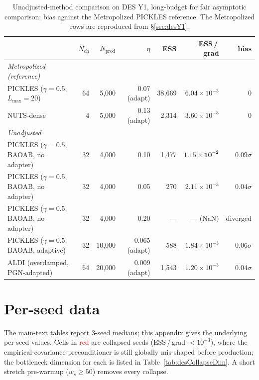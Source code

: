 \documentclass{article}
\begin{document}
\begin{table}[h]
\centering
\caption{Unadjusted-method comparison on DES Y1, long-budget for fair
asymptotic comparison; bias against the Metropolized PICKLES reference.
The Metropolized rows are reproduced from \S\ref{sec:desY1}.}
\label{tab:desUnadjLongN}
\small
\begin{tabular}{l rrrr rr}
\toprule
& $N_{\text{ch}}$ & $N_{\text{prod}}$ & $\eta$ & ESS &
ESS\,/\,grad & bias \\
\midrule
\textit{Metropolized (reference)} & & & & & & \\
\quad PICKLES ($\gamma=0.5$, $L_{\max}=20$) & 64 & 5{,}000 & 0.07 (adapt) & 38{,}669 & $6.04\!\times\!10^{-3}$ & 0 \\
\quad NUTS-dense                            & 4  & 5{,}000 & 0.13 (adapt) & 2{,}314  & $3.60\!\times\!10^{-3}$ & 0 \\
\midrule
\textit{Unadjusted} & & & & & & \\
\quad PICKLES ($\gamma=0.5$, BAOAB, no adapter) & 32 & 4{,}000 & 0.10  & 1{,}477 & $\mathbf{1.15\!\times\!10^{-2}}$ & $0.09\sigma$ \\
\quad PICKLES ($\gamma=0.5$, BAOAB, no adapter) & 32 & 4{,}000 & 0.05  &     270 & $2.11\!\times\!10^{-3}$ & $0.04\sigma$ \\
\quad PICKLES ($\gamma=0.5$, BAOAB, no adapter) & 32 & 4{,}000 & 0.20  & --- & --- (NaN) & diverged \\
\quad PICKLES ($\gamma=0.5$, BAOAB, adaptive)   & 32 & 10{,}000 & 0.065 (adapt) &  588 & $1.84\!\times\!10^{-3}$ & $0.06\sigma$ \\
\quad ALDI (overdamped, PGN-adapted)            & 64 & 20{,}000 & 0.009 (adapt) & 1{,}543 & $1.20\!\times\!10^{-3}$ & $0.04\sigma$ \\
\bottomrule
\end{tabular}
\end{table}

\section{Per-seed data}\label{app:desPerSeed}

The main-text tables report $3$-seed medians; this appendix gives the
underlying per-seed values. Cells in \textcolor{red}{red} are collapsed
seeds (ESS\,/\,grad $<\!10^{-3}$), where the empirical-covariance
preconditioner is still globally mis-shaped before production; the
bottleneck dimension for each is listed in
Table~\ref{tab:desCollapseDim}. A short stretch pre-warmup
($w_s\!\ge\!50$) removes every collapse.
\end{document}
